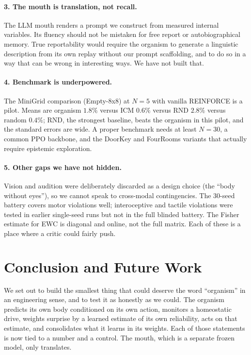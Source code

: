 \documentclass[11pt,a4paper]{article}
\begin{document}
\paragraph{3. The mouth is translation, not recall.} The LLM mouth renders a prompt we construct from measured internal variables. Its fluency should not be mistaken for free report or autobiographical memory. True reportability would require the organism to generate a linguistic description from its own replay without our prompt scaffolding, and to do so in a way that can be wrong in interesting ways. We have not built that.

\paragraph{4. Benchmark is underpowered.} The MiniGrid comparison (Empty-8x8) at $N=5$ with vanilla REINFORCE is a pilot. Means are organism $1.8\%$ versus ICM $0.6\%$ versus RND $2.8\%$ versus random $0.4\%$; RND, the strongest baseline, beats the organism in this pilot, and the standard errors are wide. A proper benchmark needs at least $N=30$, a common PPO backbone, and the DoorKey and FourRooms variants that actually require epistemic exploration.

\paragraph{5. Other gaps we have not hidden.} Vision and audition were deliberately discarded as a design choice (the ``body without eyes''), so we cannot speak to cross-modal contingencies. The 30-seed battery covers motor violations well; interoceptive and tactile violations were tested in earlier single-seed runs but not in the full blinded battery. The Fisher estimate for EWC is diagonal and online, not the full matrix. Each of these is a place where a critic could fairly push.

\section{Conclusion and Future Work}

We set out to build the smallest thing that could deserve the word ``organism'' in an engineering sense, and to test it as honestly as we could. The organism predicts its own body conditioned on its own action, monitors a homeostatic drive, weights surprise by a learned estimate of its own reliability, acts on that estimate, and consolidates what it learns in its weights. Each of those statements is now tied to a number and a control. The mouth, which is a separate frozen model, only translates.
\end{document}

